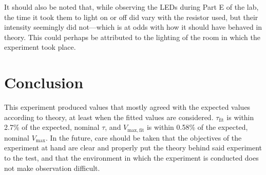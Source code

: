 \documentclass{article}
\begin{document}
	It should also be noted that, while observing the LEDs during Part E of the lab, the time it took them to light on or off did vary with the resistor used, but their intensity seemingly did not---which is at odds with how it should have behaved in theory. This could perhaps be attributed to the lighting of the room in which the experiment took place.

\section{Conclusion}
	This experiment produced values that mostly agreed with the expected values according to theory, at least when the fitted values are considered.
	$\tau_\mathrm{fit}$ is within 2.7\% of the expected, nominal $\tau$, and $V_\mathrm{max,fit}$ is within 0.58\% of the expected, nominal $V_\mathrm{max}$.
	In the future, care should be taken that the objectives of the experiment at hand are clear and properly put the theory behind said experiment to the test, and that the environment in which the experiment is conducted does not make observation difficult.
	

\appendix
\end{document}
